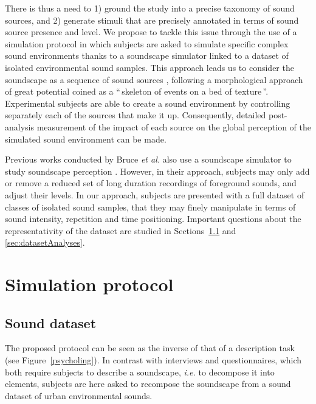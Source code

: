 \documentclass[twoside,twocolumn]{article}
\begin{document}
There is thus a need to 1) ground the study into a precise taxonomy of sound sources, and 2) generate stimuli that are precisely annotated in terms of sound source presence and level. We propose to tackle this issue through the use of a simulation protocol in which subjects are asked to simulate specific complex sound environments thanks to a soundscape simulator linked to a dataset of isolated environmental sound samples. This approach leads us to consider the soundscape as a sequence of sound sources \cite{nelken_ear_2013}, following a morphological approach of great potential coined as a ``\,skeleton of events on a bed of texture\,''. Experimental subjects are able to create a sound environment by controlling separately each of the sources that make it up. Consequently, detailed post-analysis measurement of the impact of each source on the global perception of the simulated sound environment can be made. 

Previous works conducted by Bruce \textit{et al.} also use a soundscape simulator to study soundscape perception \cite{bruce2009development,bruce2014effects}. However, in their approach, subjects may only add or remove a reduced set of long duration recordings of foreground sounds, and adjust their levels. In our approach, subjects are presented with a full dataset of classes of isolated sound samples, that they may finely manipulate in terms of sound intensity, repetition and time positioning. Important questions about the representativity of the  dataset are studied in Sections~\ref{sec:SoundDataset} and  \ref{sec:datasetAnalyses}.


\section{Simulation protocol}

\subsection{Sound dataset}
\label{sec:SoundDataset}

The proposed protocol can be seen as the inverse of that of a description task (see Figure~\ref{psycholing}). In contrast with interviews and questionnaires, which both require subjects to describe a soundscape, \textit{i.e.} to decompose it into elements, subjects are here asked to recompose the soundscape from a sound dataset of urban environmental sounds.
\end{document}
